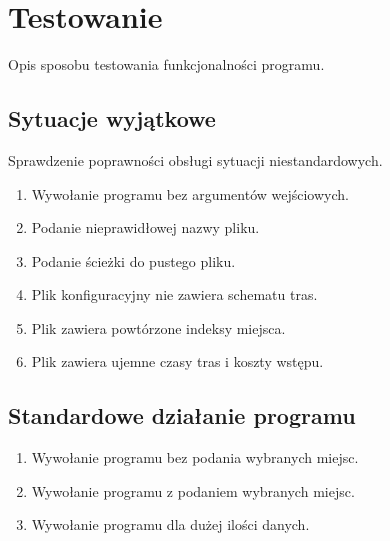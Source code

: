 \documentclass{article}
\begin{document}
\section{Testowanie}
Opis sposobu testowania funkcjonalności programu.

\subsection{Sytuacje wyjątkowe}
Sprawdzenie poprawności obsługi sytuacji niestandardowych.

\begin{enumerate}
        \item Wywołanie programu bez argumentów wejściowych.
        \item Podanie nieprawidłowej nazwy pliku.
        \item Podanie ścieżki do pustego pliku.
        \item Plik konfiguracyjny nie zawiera schematu tras.
        \item Plik zawiera powtórzone indeksy miejsca.
        \item Plik zawiera ujemne czasy tras i koszty wstępu.
\end{enumerate}

\subsection{Standardowe działanie programu}
    \begin{enumerate}
        \item Wywołanie programu bez podania wybranych miejsc.
        \item Wywołanie programu z podaniem wybranych miejsc.
        \item Wywołanie programu dla dużej ilości danych.
    \end{enumerate}
\end{document}
